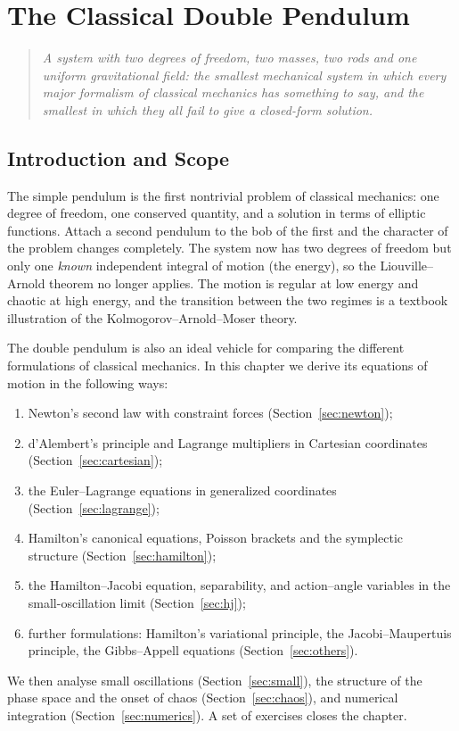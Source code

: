 \documentclass[11pt,a4paper]{book}
\theoremstyle{definition}
\theoremstyle{remark}
\begin{document}
\setcounter{chapter}{0}
\chapter{The Classical Double Pendulum}
\label{ch:double-pendulum}

\begin{quote}\itshape
A system with two degrees of freedom, two masses, two rods and one uniform gravitational field:
the smallest mechanical system in which every major formalism of classical mechanics has something
to say, and the smallest in which they all fail to give a closed-form solution.
\end{quote}

\section{Introduction and Scope}

The simple pendulum is the first nontrivial problem of classical mechanics: one degree of freedom,
one conserved quantity, and a solution in terms of elliptic functions. Attach a second pendulum to the
bob of the first and the character of the problem changes completely. The system now has two degrees of
freedom but only one \emph{known} independent integral of motion (the energy), so the Liouville--Arnold
theorem no longer applies. The motion is regular at low energy and chaotic at high energy, and the
transition between the two regimes is a textbook illustration of the Kolmogorov--Arnold--Moser theory.

The double pendulum is also an ideal vehicle for comparing the different formulations of classical
mechanics. In this chapter we derive its equations of motion in the following ways:

\begin{enumerate}
  \item Newton's second law with constraint forces (Section~\ref{sec:newton});
  \item d'Alembert's principle and Lagrange multipliers in Cartesian coordinates (Section~\ref{sec:cartesian});
  \item the Euler--Lagrange equations in generalized coordinates (Section~\ref{sec:lagrange});
  \item Hamilton's canonical equations, Poisson brackets and the symplectic structure (Section~\ref{sec:hamilton});
  \item the Hamilton--Jacobi equation, separability, and action--angle variables in the small-oscillation limit
        (Section~\ref{sec:hj});
  \item further formulations: Hamilton's variational principle, the Jacobi--Maupertuis principle, the
        Gibbs--Appell equations (Section~\ref{sec:others}).
\end{enumerate}
We then analyse small oscillations (Section~\ref{sec:small}), the structure of the phase space and the onset of
chaos (Section~\ref{sec:chaos}), and numerical integration (Section~\ref{sec:numerics}). A set of exercises closes
the chapter.
\end{document}
